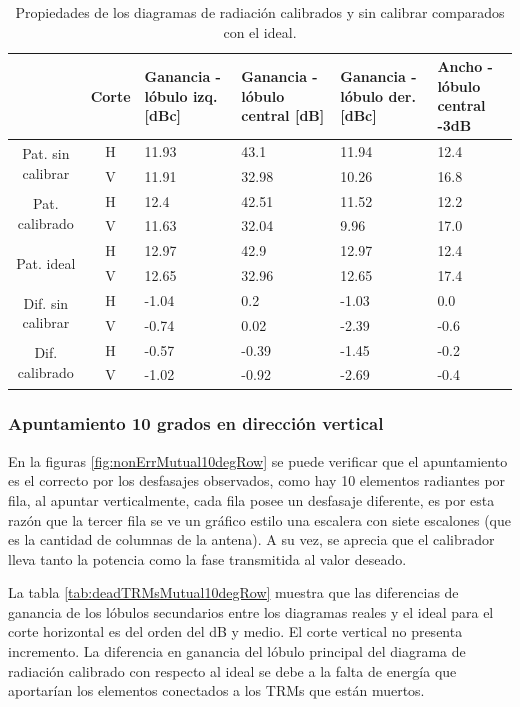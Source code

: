 \begin{table}[H]
  \footnotesize
  \centering
  \begin{tabular}{|c|c|p{2cm}|p{2.5cm}|p{2.5cm}|p{2.5cm}|}
    \cline{2-6}
    \multicolumn{1}{c|}{} & Corte & Ganancia - lóbulo izq. [dBc] & Ganancia - lóbulo central [dB] &
    Ganancia - lóbulo der. [dBc] & Ancho - lóbulo central -3dB \tabularnewline\hline
    \multirow{2}{2cm}{Pat. sin calibrar} & H & 11.93 & 43.1 & 11.94 & 12.4 \tabularnewline\cline{2-6}
     & V & 11.91 & 32.98 & 10.26 & 16.8 \tabularnewline\hline
    \multirow{2}{2cm}{Pat. calibrado} & H & 12.4 & 42.51 & 11.52 & 12.2 \tabularnewline\cline{2-6}
     & V & 11.63 & 32.04 & 9.96 & 17.0 \tabularnewline\hline
    \multirow{2}{2cm}{Pat. ideal} & H & 12.97 & 42.9 & 12.97 & 12.4 \tabularnewline\cline{2-6}
     & V & 12.65 & 32.96 & 12.65 & 17.4 \tabularnewline\hline
    \multirow{2}{2cm}{Dif. sin calibrar} & H & -1.04 & 0.2 & -1.03 & 0.0\tabularnewline\cline{2-6}
     & V & -0.74 & 0.02 & -2.39 & -0.6 \tabularnewline\hline
    \multirow{2}{2cm}{Dif. calibrado} & H & -0.57 & -0.39 & -1.45 & -0.2 \tabularnewline\cline{2-6}
     & V & -1.02 & -0.92 & -2.69 & -0.4 \tabularnewline\hline
  \end{tabular}
  \caption{Propiedades de los diagramas de radiación calibrados y sin calibrar comparados con el ideal.}
  \label{tab:deadTRMsMutual10degCol}
\end{table}


\subsubsection{Apuntamiento 10 grados en dirección vertical}

En la figuras \ref{fig:nonErrMutual10degRow} se puede verificar que el apuntamiento es el correcto por los desfasajes observados, 
como hay 10 elementos radiantes por fila, al apuntar verticalmente, cada fila posee un desfasaje diferente, es por esta razón que 
la tercer fila se ve un gráfico estilo una escalera con siete escalones (que es la cantidad de columnas de la antena). A su vez, 
se aprecia que el calibrador lleva tanto la potencia como la fase transmitida al valor deseado.

La tabla \ref{tab:deadTRMsMutual10degRow} muestra que las diferencias de ganancia de los lóbulos secundarios entre los diagramas 
reales y el ideal para el corte horizontal es del orden del dB y medio. El corte vertical no presenta incremento. La diferencia en 
ganancia del lóbulo principal del diagrama de radiación calibrado con respecto al ideal se debe a la falta de energía que 
aportarían los elementos conectados a los TRMs que están muertos.

